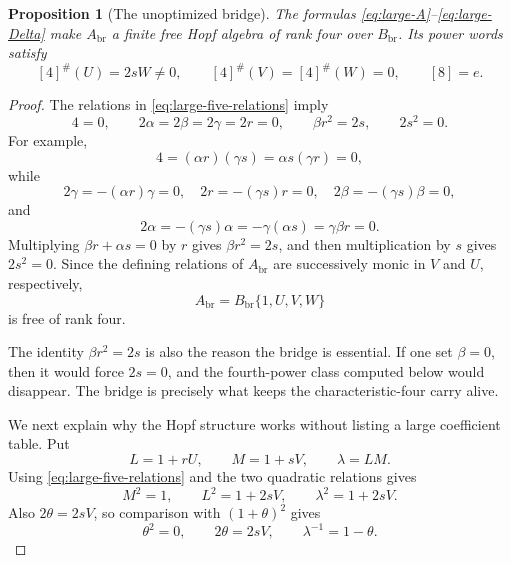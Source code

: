 \documentclass[11pt]{article}
\newtheorem{proposition}[theorem]{Proposition}
\theoremstyle{remark}
\begin{document}
\begin{proposition}[The unoptimized bridge]\label{prop:large-bridge}
The formulas \eqref{eq:large-A}--\eqref{eq:large-Delta} make
$A_{\mathrm{br}}$ a finite free Hopf algebra of rank four over
$B_{\mathrm{br}}$.  Its power words satisfy
\begin{equation}\label{eq:large-powers}
 [4]^\#(U)=2sW\ne0,
 \qquad [4]^\#(V)=[4]^\#(W)=0,
 \qquad [8]=e.
\end{equation}
\end{proposition}

\begin{proof}
The relations in \eqref{eq:large-five-relations} imply
\begin{equation}\label{eq:large-consequences}
 4=0,\qquad
 2\alpha=2\beta=2\gamma=2r=0,\qquad
 \beta r^2=2s,\qquad 2s^2=0.
\end{equation}
For example,
\[
 4=(\alpha r)(\gamma s)=\alpha s(\gamma r)=0,
\]
while
\[
 2\gamma=-(\alpha r)\gamma=0,
 \quad 2r=-(\gamma s)r=0,
 \quad 2\beta=-(\gamma s)\beta=0,
\]
and
\[
 2\alpha=-(\gamma s)\alpha
          =-\gamma(\alpha s)=\gamma\beta r=0.
\]
Multiplying $\beta r+\alpha s=0$ by $r$ gives
$\beta r^2=2s$, and then multiplication by $s$ gives $2s^2=0$.
Since the defining relations of $A_{\mathrm{br}}$ are successively
monic in $V$ and $U$, respectively,
\[
 A_{\mathrm{br}}=B_{\mathrm{br}}\{1,U,V,W\}
\]
is free of rank four.

The identity $\beta r^2=2s$ is also the reason the bridge is essential.
If one set $\beta=0$, then it would force $2s=0$, and the fourth-power
class computed below would disappear.  The bridge is precisely what keeps
the characteristic-four carry alive.

We next explain why the Hopf structure works without listing a large
coefficient table.  Put
\[
 L=1+rU,\qquad M=1+sV,\qquad\lambda=LM.
\]
Using \eqref{eq:large-five-relations} and the two quadratic relations gives
\[
 M^2=1,\qquad L^2=1+2sV,\qquad
 \lambda^2=1+2sV.
\]
Also $2\theta=2sV$, so comparison with
$(1+\theta)^2$ gives
\begin{equation}\label{eq:large-theta}
 \theta^2=0,\qquad
 2\theta=2sV,\qquad
 \lambda^{-1}=1-\theta.
\end{equation}


\end{proof}
\end{document}
